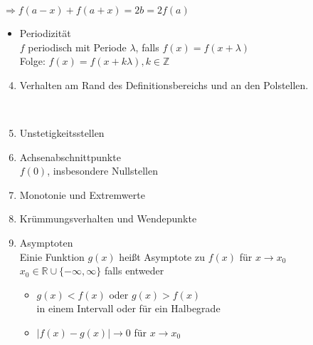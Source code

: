 \documentclass{article}
\begin{document}

$\Rightarrow f(a-x)+f(a+x)=2b=2f(a)$
\begin{itemize}
\item Periodizität\\
$f$ periodisch mit Periode $\lambda$, falls $f(x)=f(x+\lambda)$\\
Folge: $f(x)=f(x+k\lambda), k \in \mathbb{Z}$
\end{itemize}
\begin{enumerate}
  \setcounter{enumi}{3}
  \item Verhalten am Rand des Definitionsbereichs und an den Polstellen.\\
  \\
  \item Unstetigkeitsstellen 
  \item Achsenabschnittpunkte\\
  $f(0)$, insbesondere Nullstellen
  \item Monotonie und Extremwerte
  \item Krümmungsverhalten und Wendepunkte
  \item Asymptoten\\
  Einie Funktion $g(x)$ heißt Asymptote zu $f(x)$ für 
  $x \rightarrow x_0$ $x_0 \in \mathbb{R} \cup \{-\infty, \infty\}$
  falls entweder
  \begin{itemize}
  \item $g(x)<f(x)$ oder $g(x)>f(x)$\\
  in einem Intervall oder für ein Halbegrade
  \item $|f(x)-g(x)| \rightarrow 0$ für $x \rightarrow x_0$
  \end{itemize}
\end{enumerate}
\end{document}

